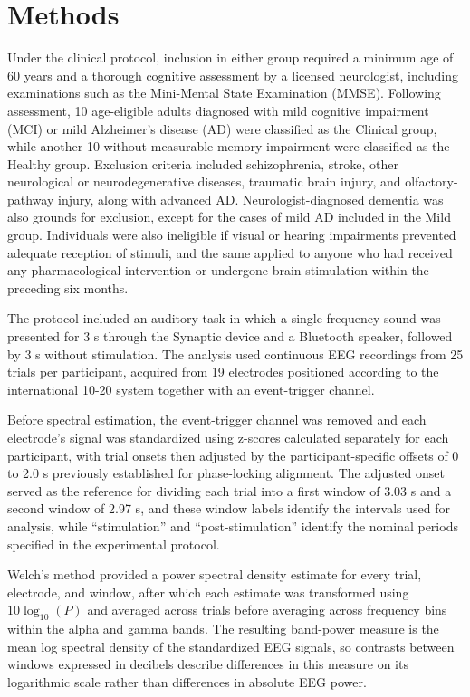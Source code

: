 \documentclass[11pt,letterpaper]{article}
\begin{document}
\section{Methods}
Under the clinical protocol, inclusion in either group required a minimum age of 60 years and a thorough cognitive assessment by a licensed neurologist, including examinations such as the Mini-Mental State Examination (MMSE). Following assessment, 10 age-eligible adults diagnosed with mild cognitive impairment (MCI) or mild Alzheimer’s disease (AD) were classified as the Clinical group, while another 10 without measurable memory impairment were classified as the Healthy group. Exclusion criteria included schizophrenia, stroke, other neurological or neurodegenerative diseases, traumatic brain injury, and olfactory-pathway injury, along with advanced AD. Neurologist-diagnosed dementia was also grounds for exclusion, except for the cases of mild AD included in the Mild group. Individuals were also ineligible if visual or hearing impairments prevented adequate reception of stimuli, and the same applied to anyone who had received any pharmacological intervention or undergone brain stimulation within the preceding six months.

The protocol included an auditory task in which a single-frequency sound was presented for 3 s through the Synaptic device and a Bluetooth speaker, followed by 3 s without stimulation. The analysis used continuous EEG recordings from 25 trials per participant, acquired from 19 electrodes positioned according to the international 10-20 system together with an event-trigger channel.

Before spectral estimation, the event-trigger channel was removed and each electrode's signal was standardized using z-scores calculated separately for each participant, with trial onsets then adjusted by the participant-specific offsets of 0 to 2.0 s previously established for phase-locking alignment. The adjusted onset served as the reference for dividing each trial into a first window of 3.03 s and a second window of 2.97 s, and these window labels identify the intervals used for analysis, while “stimulation” and “post-stimulation” identify the nominal periods specified in the experimental protocol.

Welch's method provided a power spectral density estimate for every trial, electrode, and window, after which each estimate was transformed using \(10\log_{10}(P)\) \cite{welch} and averaged across trials before averaging across frequency bins within the alpha and gamma bands. The resulting band-power measure is the mean log spectral density of the standardized EEG signals, so contrasts between windows expressed in decibels describe differences in this measure on its logarithmic scale rather than differences in absolute EEG power.
\end{document}
